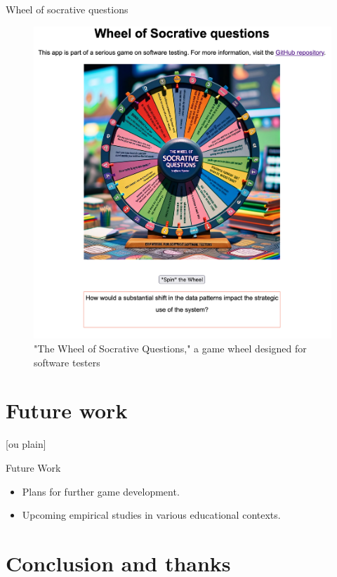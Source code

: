 \documentclass[aspectratio=169]{beamer}
\begin{document}
\begin{frame}{Wheel of socrative questions}
\begin{figure}
    \centering
    \includegraphics[width=0.5\linewidth]{images//wheel}
    \caption{"The Wheel of Socrative Questions," a game wheel designed for software testers}
\end{figure}
\end{frame}


\section{Future work}

[ou plain]
\begin{frame}{Future Work}
    \begin{itemize}
        \item Plans for further game development.
        \item Upcoming empirical studies in various educational contexts.
    \end{itemize}
\end{frame}

\section{Conclusion and thanks}

\end{document}
